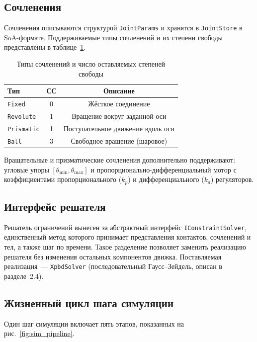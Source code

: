 \subsection{Сочленения}

Сочленения описываются структурой \texttt{Joint\-Params} и хранятся в \texttt{Joint\-Store} в SoA-формате. 
Поддерживаемые типы сочленений и их степени свободы представлены в таблице~\ref{tab:joint_types}.

\begin{table}[h]
\centering
\caption{Типы сочленений и число оставляемых степеней свободы}
\label{tab:joint_types}
\begin{tabular}{lcc}
\toprule
\textbf{Тип} & \textbf{СС} & \textbf{Описание} \\
\midrule
\texttt{Fixed}     & 0 & Жёсткое соединение \\
\texttt{Revolute}  & 1 & Вращение вокруг заданной оси \\
\texttt{Prismatic} & 1 & Поступательное движение вдоль оси \\
\texttt{Ball}      & 3 & Свободное вращение (шаровое) \\
\bottomrule
\end{tabular}
\end{table}

Вращательные и призматические сочленения дополнительно поддерживают: угловые упоры $[\theta_{\min}, 
\theta_{\max}]$ и пропорционально-дифференциальный мотор с коэффициентами пропорционального ($k_p$) и 
дифференциального ($k_d$) регуляторов.

\subsection{Интерфейс решателя}

Решатель ограничений вынесен за абстрактный интерфейс \texttt{IConstraint\-Solver}, единственный метод 
которого принимает представления контактов, сочленений и тел, а также шаг по времени. Такое разделение 
позволяет заменить реализацию решателя без изменения остальных компонентов движка. Поставляемая реализация~--- 
\texttt{XpbdSolver} (последовательный Гаусс--Зейдель, описан в разделе~2.4).

\subsection{Жизненный цикл шага симуляции}
\label{sec:sim_step}

Один шаг симуляции включает пять этапов, показанных на рис.~\ref{fig:sim_pipeline}.

